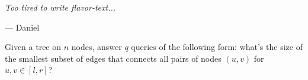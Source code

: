 \epigraph{\it{Too tired to write flavor-text...}}{--- Daniel}

Given a tree on $n$ nodes, answer $q$ queries of the following form:
what's the size of the smallest subset of edges that connects all pairs of nodes $(u, v)$ for $u, v \in [l, r]$?

